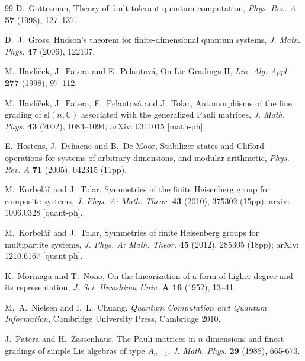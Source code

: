 \documentclass[10pt]{amsart}
\theoremstyle{plain}
\theoremstyle{definition}
\theoremstyle{remark}%
\begin{document}
\begin{thebibliography}{99}
D.~Gottesman, Theory of fault-tolerant quantum computation,
\textit{Phys. Rev. A} \textbf{57} (1998), 127--137.
	
	
D.~J.~Gross, Hudson's theorem for finite-dimensional quantum systems,
\textit{J. Math. Phys.} \textbf{47} (2006), 122107.	
	
	
M.~Havl\'{\i}\v{c}ek, J.~Patera and E.~Pelantov\'a,
On Lie Gradings II, \textit{Lin. Alg. Appl.}
{\bf 277} (1998), 97--112.	

	
M.~Havl\'{i}\v{c}ek, J.~Patera, E.~Pelantov\'a and J.~Tolar, 
Automorphisms of the fine grading of $\mathrm{sl}(n,\mathbb{C})$ associated
with the generalized Pauli matrices,
\textit{J. Math. Phys.} {\bf 43} (2002), 1083--1094; 
arXiv: 0311015 [math-ph].


E.~Hostens, J.~Dehaene and B.~De Moor, 
Stabilizer states and Clifford operations for systems of arbitrary dimensions, 
and modular	arithmetic, \textit{Phys. Rev. A} \textbf{71} (2005), 042315 (11pp).
	
	
	



	
	
	
M.~Korbel\'a\v{r} and J.~Tolar, Symmetries of the finite
Heisenberg group for composite systems, \textit{J. Phys. A: Math. Theor.} \textbf{43} (2010), 375302 (15pp); arxiv: 1006.0328 [quant-ph].

M.~Korbel\'a\v{r} and J.~Tolar, Symmetries of finite Heisenberg
groups for multipartite systems, \textit{J. Phys. A: Math. Theor.}
\textbf{45} (2012), 285305 (18pp); arXiv: 1210.6167 [quant-ph].



K.~Morinaga and T.~Nono,
On the linearization of a form of higher degree and its representation,
\textit{J. Sci. Hiroshima Univ.} \textbf{A 16} (1952), 13--41.


M.~A.~Nielsen and I.~L.~Chuang, 
\textit{Quantum Computation and Quantum Information},
Cambridge University Press, Cambridge 2010.



J.~Patera and H.~Zassenhaus,
The Pauli matrices in $n$ dimensions and finest
gradings of simple Lie algebras of type $A_{n-1}$,
\textit{J. Math. Phys.} {\bf 29} (1988), 665-673.




\end{thebibliography}
\end{document}
